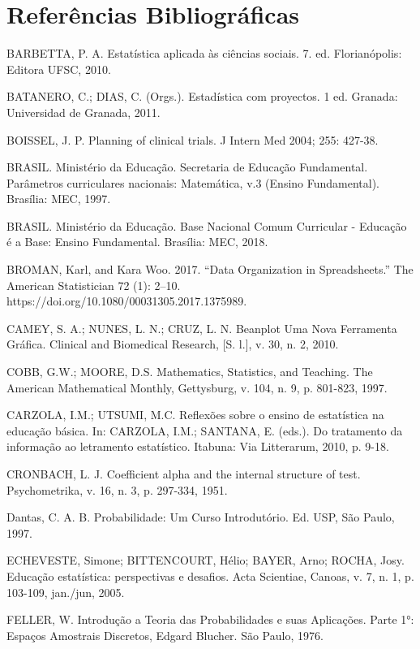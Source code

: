 \chapter{Referências Bibliográficas}

BARBETTA, P. A. Estatística aplicada às ciências sociais. 7. ed. Florianópolis: Editora UFSC, 2010.\vskip0.3cm

BATANERO, C.; DIAS, C. (Orgs.). Estadística com proyectos. 1 ed. Granada: Universidad de Granada, 2011.\vskip0.3cm

BOISSEL, J. P. Planning of clinical trials. J Intern Med 2004; 255: 427-38.\vskip0.3cm

BRASIL. Ministério da Educação. Secretaria de Educação Fundamental. Parâmetros curriculares nacionais: Matemática, v.3 (Ensino Fundamental). Brasília: MEC, 1997. \vskip0.3cm

BRASIL. Ministério da Educação. Base Nacional Comum Curricular - Educação é a Base: Ensino Fundamental. Brasília: MEC, 2018.\vskip0.3cm

BROMAN, Karl, and Kara Woo. 2017. “Data Organization in Spreadsheets.” The American Statistician 72 (1): 2–10. https://doi.org/10.1080/00031305.2017.1375989.\vskip0.3cm

CAMEY, S. A.; NUNES, L. N.; CRUZ, L. N. Beanplot Uma Nova Ferramenta Gráfica. Clinical and Biomedical Research, [S. l.], v. 30, n. 2, 2010.\vskip0.3cm

COBB, G.W.; MOORE, D.S. Mathematics, Statistics, and Teaching. The American Mathematical Monthly, Gettysburg, v. 104, n. 9, p. 801-823, 1997.\vskip0.3cm

CARZOLA, I.M.; UTSUMI, M.C. Reflexões sobre o ensino de estatística na educação básica. In: CARZOLA, I.M.; SANTANA, E. (eds.). Do tratamento da informação ao letramento estatístico. Itabuna: Via Litterarum, 2010, p. 9-18.\vskip0.3cm

CRONBACH, L. J. Coefficient alpha and the internal structure of test. Psychometrika, v. 16, n. 3, p. 297-334, 1951.\vskip0.3cm

Dantas, C. A. B. Probabilidade: Um Curso Introdutório. Ed.
USP, São Paulo, 1997.\vskip0.3cm

ECHEVESTE, Simone; BITTENCOURT, Hélio; BAYER, Arno; ROCHA, Josy. Educação estatística: perspectivas e desafios. Acta Scientiae, Canoas, v. 7, n. 1, p. 103-109, jan./jun, 2005.\vskip0.3cm

FELLER, W. Introdução a Teoria das Probabilidades e suas
Aplicações. Parte 1°: Espaços Amostrais Discretos, Edgard Blucher. São Paulo, 1976.\vskip0.3cm


